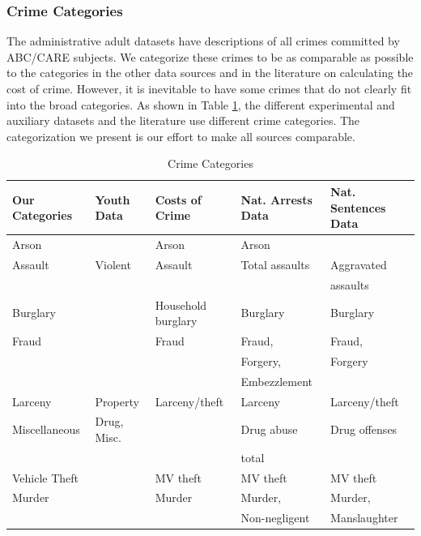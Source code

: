 \subsubsection{Crime Categories}
\noindent The administrative adult datasets have descriptions of all crimes committed by ABC/CARE subjects. We categorize these crimes to be as comparable as possible to the categories in the other data sources and in the literature on calculating the cost of crime. However, it is inevitable to have some crimes that do not clearly fit into the broad categories. As shown in Table \ref{tab:crime_cat}, the different experimental and auxiliary datasets and the literature use different crime categories. The categorization we present is our effort to make all sources comparable. \\

\begin{table}[H]
\begin{threeparttable}
\scriptsize \caption{Crime Categories} \label{tab:crime_cat}
\begin{tabular}{lllll}
\toprule
{Our Categories}	&	{Youth Data} & {Costs of Crime} & {Nat. Arrests Data} & {Nat. Sentences Data}	\\
\midrule
{Arson}			&			& Arson					&	Arson			&					\\	
{Assault}			&	Violent			& Assault				&	Total assaults	& Aggravated 		\\		
				&				&						&					& assaults 			\\ 		
{Burglary}		&				& Household burglary	&	Burglary		& Burglary			\\		
{Fraud}			&				& Fraud					&	Fraud,			& Fraud,			\\		
				&				&						&	Forgery,		& Forgery			\\
				&				&						&	Embezzlement	&					\\		
{Larceny}			&	Property	& Larceny/theft			&	Larceny			& Larceny/theft		\\		
{Miscellaneous}	& 	Drug, Misc.	& 					&	Drug abuse		& Drug offenses		\\		
				&				&						&	total			&					\\ 		
{Vehicle Theft}	&				& MV theft	&	MV theft		& MV theft			\\		
{Murder}			&				& Murder				&	Murder,			& Murder,			\\	
				&				&						& 	Non-negligent 	& Manslaughter		\\

\end{tabular}
\end{threeparttable}
\end{table}
